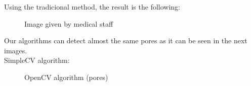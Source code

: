 Using the tradicional method, the result is the following:

    \begin{figure}[H]
      \caption{Image given by medical staff}
      \centering \setlength\fboxsep{0pt} \setlength\fboxrule{0.5pt}
    \end{figure}

Our algorithms can detect almost the same pores as it can be seen in the next images.\\
SimpleCV algorithm:

    \begin{figure}[H]
      \caption{OpenCV algorithm (pores)}
      \centering \setlength\fboxsep{0pt} \setlength\fboxrule{0.5pt}
    \end{figure}

